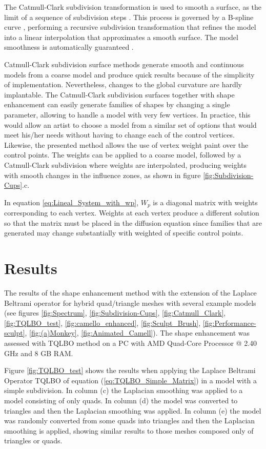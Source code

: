 \documentclass[10pt, conference]{IEEEtran}
\begin{document}
The Catmull-Clark subdivision transformation is used to smooth a surface,
as the limit of a sequence of subdivision steps \cite{Stam1998}.
This process is governed by a B-spline curve \cite{Loop1987}, performing
a recursive subdivision transformation that refines the model into
a linear interpolation that approximates a smooth surface. The model
smoothness is automatically guaranteed \cite{DeRose1998}. 

Catmull-Clark subdivision surface methods generate smooth and continuous
models from a coarse model and produce quick results because of the
simplicity of implementation. Nevertheless, changes to the global
curvature are hardly implantable. The Catmull-Clark subdivision surfaces
together with shape enhancement can easily generate families of shapes
by changing a single parameter, allowing to handle a model with very
few vertices. In practice, this would allow an artist to choose a
model from a similar set of options that would meet his/her needs
without having to change each of the control vertices. Likewise, the
presented method allows the use of vertex weight paint over the control
points. The weights can be applied to a coarse model, followed by
a Catmull-Clark subdivision where weights are interpolated, producing
weights with smooth changes in the influence zones, as shown in figure
\ref{fig:Subdivision-Cups}.c.

In equation \ref{eq:Lineal_System_with_wp}, $W_{p}$ is a diagonal
matrix with weights corresponding to each vertex. Weights at each
vertex produce a different solution so that the matrix must be placed
in the diffusion equation since families that are generated may change
substantially with weighted of specific control points.


\section{Results\label{sec:Results}}

The results of the shape enhancement method with the extension of
the Laplace Beltrami operator for hybrid quad/triangle meshes with
several example models (see figures \ref{fig:Spectrum}, \ref{fig:Subdivision-Cups},
\ref{fig:Catmull_Clark}, \ref{fig:TQLBO_test}, \ref{fig:camello_enhanced},
\ref{fig:Sculpt_Brush}, \ref{fig:Performance-sculpt}, \ref{fig:(a)Monkey},
\ref{fig:Animated_Camell}). The shape enhancement was assessed with
TQLBO method on a PC with AMD Quad-Core Processor @ 2.40 GHz and 8
GB RAM.

Figure \ref{fig:TQLBO_test} shows the results when applying the Laplace
Beltrami Operator TQLBO of equation (\ref{eq:TQLBO_Simple_Matrix})
in a model with a simple subdivision. In column (c) the Laplacian
smoothing was applied to a model consisting of only quads. In column
(d) the model was converted to triangles and then the Laplacian smoothing
was applied. In column (e) the model was randomly converted from some
quads into triangles and then the Laplacian smoothing is applied,
showing similar results to those meshes composed only of triangles
or quads.
\end{document}

